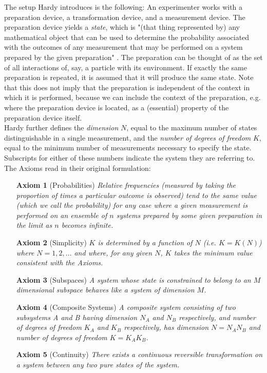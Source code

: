 \documentclass[11pt, a4paper]{article}
\begin{document}
The setup Hardy introduces is the following: An experimenter works with a preparation device, a transformation device, and a measurement device. The preparation device yields a \emph{state}, which is "(that thing represented by) any mathematical object that can be used to determine the probability associated with the outcomes of any measurement that may be performed on a system prepared by the given preparation" \cite{hardy2001quantum}. The preparation can be thought of as the set of all interactions of, say, a particle with its environment. If exactly the same preparation is repeated, it is assumed that it will produce the same state. Note that this does not imply that the preparation is independent of the context in which it is performed, because we can include the context of the preparation, e.g. where the preparation device is located, as a (essential) property of the preparation device itself.\\
Hardy further defines the \emph{dimension} $N$, equal to the maximum number of states distinguishable in a single measurement, and the \emph{number of degrees of freedom} $K$, equal to the minimum number of measurements necessary to specify the state. Subscripts for either of these numbers indicate the system they are referring to. \\
The Axioms read in their original formulation:
\begin{itemize}
\setlength{\itemindent}{3em}
\item[\textbf{Axiom 1}] (Probabilities) \emph{Relative frequencies (measured by taking the proportion of times a particular outcome is observed) tend to the same value (which we call the probability) for any case where a given measurement is performed on an ensemble of $n$ systems prepared by some given preparation in the limit as $n$ becomes infinite.}
\item[\textbf{Axiom 2}] (Simplicity) \emph{$K$ is determined by a function of $N$ (i.e. $K = K(N)$)  where $N=1,2,\ldots$ and where, for any given $N$, $K$ takes the minimum value consistent with the Axioms.}
\item[\textbf{Axiom 3}] (Subspaces) \emph{A system whose state is constrained to belong to an $M$ dimensional subspace behaves like a system of dimension $M$.}
\item[\textbf{Axiom 4}] (Composite Systems) \emph{A composite system consisting of two subsystems A and B having dimension $N_A$ and $N_B$ respectively, and number of degrees of freedom $K_A$ and $K_B$ respectively, has dimension $N = N_AN_B$ and number of degrees of freedom $K = K_AK_B$.}
\item[\textbf{Axiom 5}] (Continuity) \emph{There exists a continuous reversible transformation on a system between any two pure states of the system.}
\end{itemize}
\end{document}
